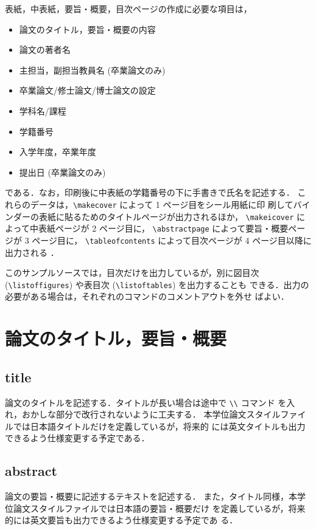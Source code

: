 \documentclass[11pt,titlepage,uplatex]{ujreport}
\begin{document}
表紙，中表紙，要旨・概要，目次ページの作成に必要な項目は，
\begin{itemize}
  \item 論文のタイトル，要旨・概要の内容
  \item 論文の著者名
  \item 主担当，副担当教員名 (卒業論文のみ)
  \item 卒業論文/修士論文/博士論文の設定
  \item 学科名/課程
  \item 学籍番号
  \item 入学年度，卒業年度
  \item 提出日 (卒業論文のみ)
\end{itemize}
である．なお，印刷後に中表紙の学籍番号の下に手書きで氏名を記述する．
これらのデータは，\verb|\makecover| によって 1 ページ目をシール用紙に印
刷してバインダーの表紙に貼るためのタイトルページが出力されるほか，
\verb|\makeicover| によって中表紙ページが 2 ページ目に，
\verb|\abstractpage| によって要旨・概要ページが 3 ページ目に，
\verb|\tableofcontents| によって目次ページが 4 ページ目以降に出力される
．

このサンプルソースでは，目次だけを出力しているが，別に図目次
(\verb|\listoffigures|) や表目次 (\verb|\listoftables|) を出力することも
できる．出力の必要がある場合は，それぞれのコマンドのコメントアウトを外せ
ばよい．

\section{論文のタイトル，要旨・概要}

\subsection{title}
論文のタイトルを記述する．タイトルが長い場合は途中で \verb/\\/ コマンド
を入れ，おかしな部分で改行されないように工夫する．
本学位論文スタイルファイルでは日本語タイトルだけを定義しているが，将来的
には英文タイトルも出力できるよう仕様変更する予定である．

\subsection{abstract}
論文の要旨・概要に記述するテキストを記述する．
また，タイトル同様，本学位論文スタイルファイルでは日本語の要旨・概要だけ
を定義しているが，将来的には英文要旨も出力できるよう仕様変更する予定であ
る．
\end{document}
